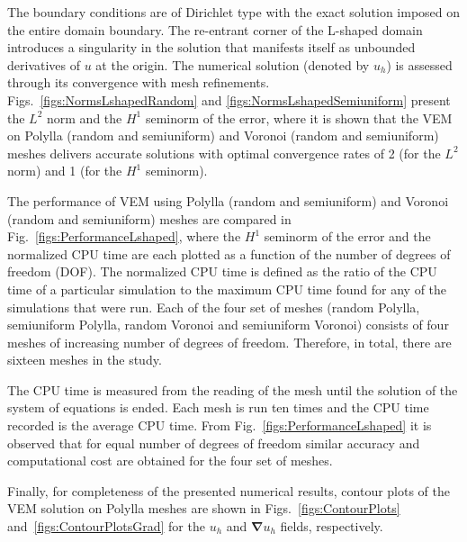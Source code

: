\documentclass[lineno,pdflatex,sn-mathphys]{sn-jnl}%
\theoremstyle{thmstyleone}%
\theoremstyle{thmstyletwo}%
\theoremstyle{thmstylethree}%
\begin{document}
The boundary conditions are of Dirichlet type with the exact solution imposed on the entire domain boundary. The re-entrant corner of the L-shaped domain introduces a singularity in the solution that manifests  itself as unbounded derivatives of $u$ at the origin. The numerical solution (denoted by $u_h$) is assessed  through its convergence with mesh refinements. Figs.~\ref{figs:NormsLshapedRandom} and 
\ref{figs:NormsLshapedSemiuniform} present the $L^2$ norm and the $H^1$ seminorm of the error, where it is shown that the VEM on Polylla (random and semiuniform) and Voronoi (random and semiuniform) meshes delivers accurate solutions with optimal convergence rates of 2 (for the $L^2$ norm) and 1 (for the $H^1$ seminorm).

The performance of VEM using Polylla (random and semiuniform) and Voronoi (random and semiuniform) meshes are compared in Fig.~\ref{figs:PerformanceLshaped}, where the $H^1$ seminorm of the error and the normalized CPU time are each plotted as a function of the number of degrees of freedom (DOF). The normalized CPU time is defined as the ratio of the CPU time of a particular simulation to the maximum CPU time found for any of the simulations that were run. Each of the four set of meshes (random Polylla, semiuniform Polylla, random Voronoi and semiuniform Voronoi) consists of four meshes of increasing number of degrees of freedom. Therefore, in total, there are sixteen meshes in the study. 

The CPU time is measured from the reading of the mesh until the solution of the system of equations is ended. Each mesh is run ten times and the CPU time recorded is the average CPU time. From Fig.~\ref{figs:PerformanceLshaped} it is observed that for equal number of degrees of freedom similar accuracy and computational cost are obtained for the four set of meshes.

Finally, for completeness of the presented numerical results, contour plots of the VEM solution on Polylla meshes are shown in Figs.~\ref{figs:ContourPlots} and~\ref{figs:ContourPlotsGrad} for the $u_h$ and $\bm{\nabla}u_h$ fields, respectively.
\end{document}

